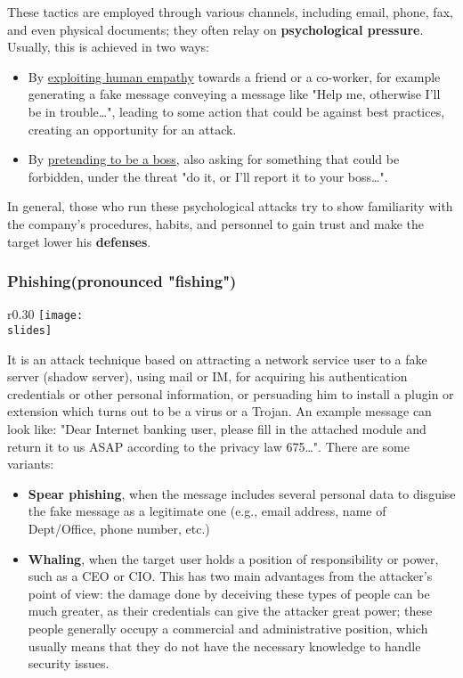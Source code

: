 These tactics are employed through various channels, including email, phone, fax, and even physical documents; they often relay on \textbf{psychological pressure}. Usually, this is achieved in two ways:
\begin{itemize}
  \item By \ul{exploiting human empathy} towards a friend or a co-worker, for example generating a fake message conveying a message like "Help me, otherwise I'll be in trouble…", leading to some action that could be against best practices, creating an opportunity for an attack.
  \item By \ul{pretending to be a boss}, also asking for something that could be forbidden, under the threat "do it, or I'll report it to your boss…".
\end{itemize}

In general, those who run these psychological attacks try to show familiarity with the company's procedures, habits, and personnel to gain trust and make the target lower his \textbf{defenses}.


\subsubsection{Phishing(pronounced "fishing")}
\begin{wrapfigure}{r}{0.30\textwidth}
  \centering
  \texttt{[image: \\slides]}
\end{wrapfigure}
It is an attack technique based on attracting a network service user to a fake server (shadow server), using mail or IM, for acquiring his authentication credentials or other personal information, or persuading him to install a plugin or extension which turns out to be a virus or a Trojan.
An example message can look like: "Dear Internet banking user, please fill in the attached module and return it to us ASAP according to the privacy law 675…". There are some variants:
\begin{itemize}
  \item \textbf{Spear phishing}, when the message includes several personal data to disguise the fake message as a legitimate one (e.g., email address, name of Dept/Office, phone number, etc.)
  \item \textbf{Whaling}, when the target user holds a position of responsibility or power, such as a CEO or CIO. This has two main advantages from the attacker's point of view: the damage done by deceiving these types of people can be much greater, as their credentials can give the attacker great power; these people generally occupy a commercial and administrative position, which usually means that they do not have the necessary knowledge to handle security issues.
\end{itemize}


